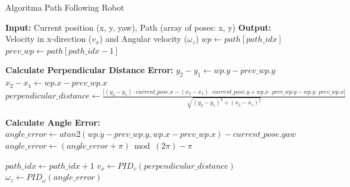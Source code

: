 \begin{algorithm}
  \caption{Algoritma Path Following Robot}
  \begin{algorithmic}[1]
  \State \textbf{Input:} Current position (x, y, yaw), Path (array of poses: x, y)
  \State \textbf{Output:} Velocity in x-direction ($v_x$) and Angular velocity ($\omega_z$)
      \State $wp \gets path[path\_idx]$
      \State $prev\_wp \gets path[path\_idx - 1]$
      
      \State \textbf{Calculate Perpendicular Distance Error:}
      \State $y_2 - y_1 \gets wp.y - prev\_wp.y$
      \State $x_2 - x_1 \gets wp.x - prev\_wp.x$
      \State $perpendicular\_distance \gets \frac{|(y_2 - y_1) \cdot current\_pose.x - (x_2 - x_1) \cdot current\_pose.y + wp.x \cdot prev\_wp.y - wp.y \cdot prev\_wp.x|}{\sqrt{(y_2 - y_1)^2 + (x_2 - x_1)^2}}$
      
      \State \textbf{Calculate Angle Error:}
      \State $angle\_error \gets atan2(wp.y - prev\_wp.y, wp.x - prev\_wp.x) - current\_pose.yaw$
      \State $angle\_error \gets (angle\_error + \pi) \bmod (2\pi) - \pi$ 


          \State $path\_idx \gets path\_idx + 1$
      \Else
          \State $v_x \gets PID_v (perpendicular\_distance)$
          \State $\omega_z \gets PID_\omega (angle\_error)$
      \EndIf
  \EndWhile
  \end{algorithmic}
\end{algorithm}

